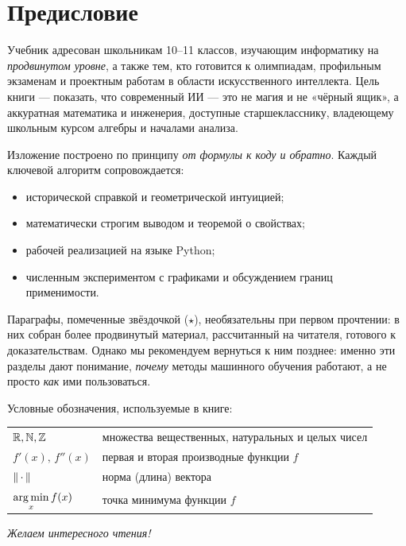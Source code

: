 \chapter*{Предисловие}

Учебник адресован школьникам 10–11 классов, изучающим информатику на
\emph{продвинутом уровне}, а также тем, кто готовится к олимпиадам,
профильным экзаменам и проектным работам в области искусственного
интеллекта. Цель книги — показать, что современный ИИ — это не
магия и не «чёрный ящик», а аккуратная математика и инженерия,
доступные старшекласснику, владеющему школьным курсом алгебры и
началами анализа.

Изложение построено по принципу \emph{от формулы к коду и обратно}.
Каждый ключевой алгоритм сопровождается:
\begin{itemize}
  \item исторической справкой и геометрической интуицией;
  \item математически строгим выводом и теоремой о свойствах;
  \item рабочей реализацией на языке Python;
  \item численным экспериментом с графиками и обсуждением границ
        применимости.
\end{itemize}

Параграфы, помеченные звёздочкой ($\star$), необязательны при первом
прочтении: в них собран более продвинутый материал, рассчитанный на
читателя, готового к доказательствам. Однако мы рекомендуем
вернуться к ним позднее: именно эти разделы дают понимание, \emph{почему}
методы машинного обучения работают, а не просто \emph{как} ими
пользоваться.

Условные обозначения, используемые в книге:

\noindent\begin{tabular}{@{}p{4cm}p{10cm}@{}}
$\mathbb{R}, \mathbb{N}, \mathbb{Z}$ & множества вещественных, натуральных и целых чисел \\
$f'(x),\, f''(x)$ & первая и вторая производные функции $f$ \\
$\left\|\,\cdot\,\right\|$ & норма (длина) вектора \\
$\operatorname*{arg\,min}\limits_{x} f(x)$ & точка минимума функции $f$ \\
\end{tabular}

\bigskip
\noindent\textit{Желаем интересного чтения!}
